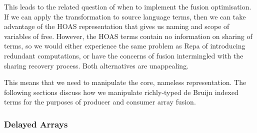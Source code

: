 This leads to the related question of when to implement the fusion optimisation.
If we can apply the transformation to source language terms, then we can take
advantage of the HOAS representation that gives us naming and scope of variables
of free. However, the HOAS terms contain no information on sharing of terms, so
we would either experience the same problem as Repa of introducing redundant
computations, or have the concerns of fusion intermingled with the sharing
recovery process. Both alternatives are unappealing.

This means that we need to manipulate the core, nameless 
representation. The following sections discuss how we manipulate richly-typed de
Bruijn indexed terms for the purposes of producer and consumer array fusion.


\subsubsection{Delayed Arrays}

